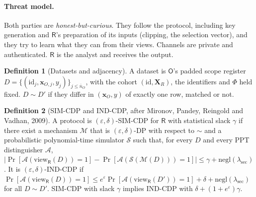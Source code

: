 \documentclass[11pt]{article}
\theoremstyle{definition}
\newtheorem{definition}{Definition}
\theoremstyle{plain}
\newcommand{\Rp}{\mathsf{R}}
\newcommand{\Op}{\mathsf{O}}
\newcommand{\bX}{\mathbf{X}}
\newcommand{\bx}{\mathbf{x}}
\begin{document}
\paragraph{Threat model.} Both parties are \emph{honest-but-curious}. They follow the protocol, including key generation and $\Rp$'s preparation of its inputs (clipping, the selection vector), and they try to learn what they can from their views. Channels are private and authenticated. $\Rp$ is the analyst and receives the output.

\begin{definition}[Datasets and adjacency]
A dataset is $\Op$'s padded scope register $D=\{(\mathrm{id}_j,\bx_{O,j},y_j)\}_{j\le\bar n_O}$, with the cohort $(\mathrm{id},\bX_R)$, the identifiers and $\Phi$ held fixed. $D\sim D'$ if they differ in $(\bx_O,y)$ of exactly one row, matched or not.
\end{definition}

\begin{definition}[SIM-CDP and IND-CDP, after Mironov, Pandey, Reingold and Vadhan, 2009]
A protocol is $(\varepsilon,\delta)$-SIM-CDP for $\Rp$ with statistical slack $\gamma$ if there exist a mechanism $\mathcal{M}$ that is $(\varepsilon,\delta)$-DP with respect to $\sim$ and a probabilistic polynomial-time simulator $\mathcal{S}$ such that, for every $D$ and every PPT distinguisher $\mathcal A$, $|\Pr[\mathcal A(\mathrm{view}_{\Rp}(D))=1]-\Pr[\mathcal A(\mathcal{S}(\mathcal{M}(D)))=1]|\le\gamma+\mathrm{negl}(\lambda_{\mathrm{sec}})$. It is $(\varepsilon,\delta)$-IND-CDP if $\Pr[\mathcal A(\mathrm{view}_{\Rp}(D))=1]\le e^\varepsilon\Pr[\mathcal A(\mathrm{view}_{\Rp}(D'))=1]+\delta+\mathrm{negl}(\lambda_{\mathrm{sec}})$ for all $D\sim D'$. SIM-CDP with slack $\gamma$ implies IND-CDP with $\delta+(1+e^\varepsilon)\gamma$.
\end{definition}
\end{document}
